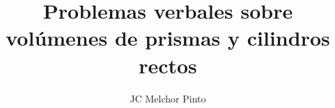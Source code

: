 \documentclass[12pt,addpoints,answers]{guia}
\title{Problemas verbales sobre volúmenes de prismas y cilindros rectos}
\author{JC Melchor Pinto}
\begin{document}
\pagestyle{headandfoot}

\INFO
\begin{multicols}{2}
    
    
    
    
\end{multicols}
\begin{questions}
    \questionboxed[10]{}
    \questionboxed[15]{}
    \questionboxed[10]{}
    \questionboxed[10]{}
    \questionboxed[15]{}
    \questionboxed[10]{}
    \questionboxed[10]{}
    \questionboxed[10]{}
    \questionboxed[10]{}
\end{questions}
\end{document}
